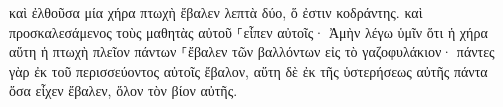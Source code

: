 \documentclass{openreader}
\begin{document}
καὶ ἐλθοῦσα μία χήρα πτωχὴ ἔβαλεν λεπτὰ δύο, ὅ ἐστιν κοδράντης. 
καὶ προσκαλεσάμενος τοὺς μαθητὰς αὐτοῦ ⸀εἶπεν αὐτοῖς· Ἀμὴν λέγω ὑμῖν ὅτι ἡ χήρα αὕτη ἡ πτωχὴ πλεῖον πάντων ⸀ἔβαλεν τῶν βαλλόντων εἰς τὸ γαζοφυλάκιον· 
πάντες γὰρ ἐκ τοῦ περισσεύοντος αὐτοῖς ἔβαλον, αὕτη δὲ ἐκ τῆς ὑστερήσεως αὐτῆς πάντα ὅσα εἶχεν ἔβαλεν, ὅλον τὸν βίον αὐτῆς. 
\end{document}
